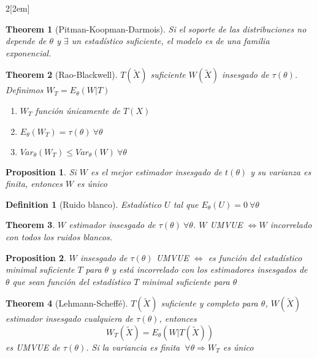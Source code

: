 \documentclass[leqno]{article}
\newtheorem*{theorem}{Theorem}
\newtheorem*{proposition}{Proposition}
\newtheorem*{definition}{Definition}
\begin{document}
\begin{multicols}{2}[\columnsep2em]
\begin{theorem} [Pitman-Koopman-Darmois]
    Si el soporte de las distribuciones no depende de $\theta$ y $\exists$ un estadístico suficiente, el modelo es de una familia exponencial.
\end{theorem}

\begin{theorem}[Rao-Blackwell] $T(\tilde{X})$ suficiente $W(\tilde{X})$ insesgado de $\tau (\theta )$. Definimos $W_T = E_\theta (W|T)$
  \begin{enumerate}[topsep=-6pt, itemsep=0pt]
    \item $W_T$ función únicamente de  $T(X)$
	\item  $E_\theta (W_T) = \tau (\theta ) \ \forall \theta$
	\item $Var_\theta (W_T) \le Var_\theta (W) \ \forall \theta$
  \end{enumerate}
\end{theorem}

\begin{proposition} Si $W$ es el mejor estimador insesgado de  $t(\theta)$ y su varianza es finita, entonces $W$ es único 
\end{proposition}

\begin{definition}[Ruido blanco] Estadístico $U$ tal que  $E_\theta (U)=0 \ \forall \theta $
\end{definition}

\begin{theorem} $W$ estimador insesgado de  $\tau (\theta )\ \forall \theta $. $W$ UMVUE  $\iff W$ incorrelado con todos los ruidos blancos. 
\end{theorem}

\begin{proposition}$W$ insesgado de  $\tau (\theta )$ UMVUE $\iff$ es función del estadístico minimal suficiente $T$ para $\theta$ y está incorrelado con los estimadores insesgados de $\theta $ que sean función del estadístico $T$ minimal suficiente para $\theta$
\end{proposition}

\begin{theorem}[Lehmann-Scheffé] $T(\tilde{X})$ suficiente y completo para $\theta$, $W(\tilde{X})$ estimador insesgado cualquiera de $\tau (\theta )$, entonces  
  \[
  W_T(\tilde{X}) = E_\theta (W|T(\tilde{X}))
  \] 
  es UMVUE de $\tau (\theta )$. Si la variancia es finita $\ \forall \theta \Rightarrow W_T$ es único

\end{theorem}


\end{multicols}
\end{document}
